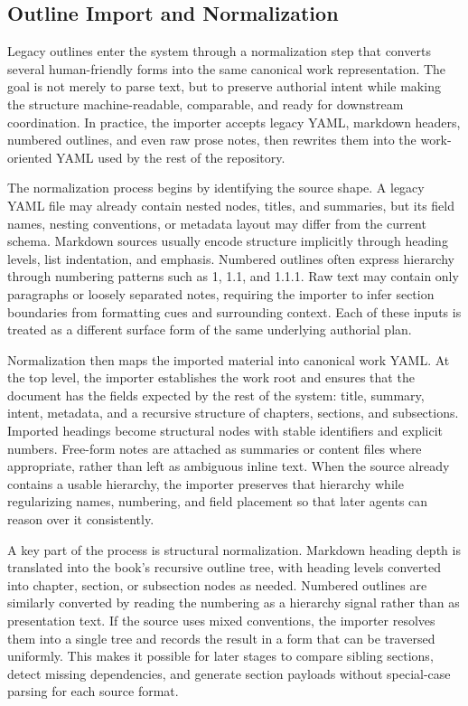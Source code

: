 \documentclass[11pt]{article}
\begin{document}

\subsection{Outline Import and Normalization}


Legacy outlines enter the system through a normalization step that converts several human-friendly forms into the same canonical work representation. The goal is not merely to parse text, but to preserve authorial intent while making the structure machine-readable, comparable, and ready for downstream coordination. In practice, the importer accepts legacy YAML, markdown headers, numbered outlines, and even raw prose notes, then rewrites them into the work-oriented YAML used by the rest of the repository.

The normalization process begins by identifying the source shape. A legacy YAML file may already contain nested nodes, titles, and summaries, but its field names, nesting conventions, or metadata layout may differ from the current schema. Markdown sources usually encode structure implicitly through heading levels, list indentation, and emphasis. Numbered outlines often express hierarchy through numbering patterns such as 1, 1.1, and 1.1.1. Raw text may contain only paragraphs or loosely separated notes, requiring the importer to infer section boundaries from formatting cues and surrounding context. Each of these inputs is treated as a different surface form of the same underlying authorial plan.

Normalization then maps the imported material into canonical work YAML. At the top level, the importer establishes the work root and ensures that the document has the fields expected by the rest of the system: title, summary, intent, metadata, and a recursive structure of chapters, sections, and subsections. Imported headings become structural nodes with stable identifiers and explicit numbers. Free-form notes are attached as summaries or content files where appropriate, rather than left as ambiguous inline text. When the source already contains a usable hierarchy, the importer preserves that hierarchy while regularizing names, numbering, and field placement so that later agents can reason over it consistently.

A key part of the process is structural normalization. Markdown heading depth is translated into the book's recursive outline tree, with heading levels converted into chapter, section, or subsection nodes as needed. Numbered outlines are similarly converted by reading the numbering as a hierarchy signal rather than as presentation text. If the source uses mixed conventions, the importer resolves them into a single tree and records the result in a form that can be traversed uniformly. This makes it possible for later stages to compare sibling sections, detect missing dependencies, and generate section payloads without special-case parsing for each source format.
\end{document}
